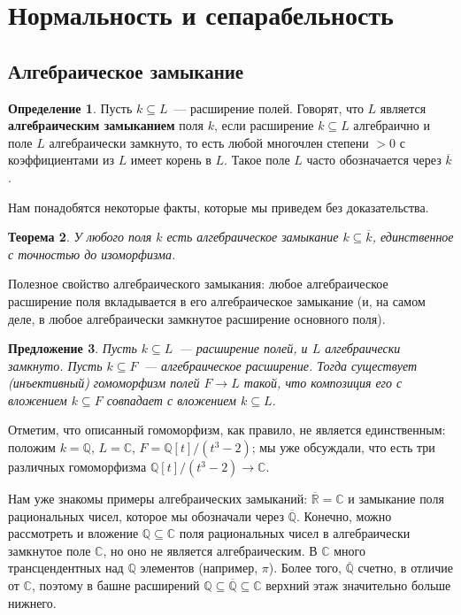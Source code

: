 \documentclass[a4paper,11pt]{scrartcl}
\theoremstyle{plain}
\newtheorem{theorem}{Теорема}[subsection]
\newtheorem{proposition}[theorem]{Предложение}
\theoremstyle{definition}
\newtheorem{definition}[theorem]{Определение}
\newcommand\dfn[1]{\textbf{#1}}
\newcommand\mb{\mathbb}
\newcommand\sseq{\subseteq}
\begin{document}
\section{Нормальность и сепарабельность}

\subsection{Алгебраическое замыкание}

\begin{definition}
Пусть $k\sseq L$~--- расширение полей. Говорят, что $L$ является
\dfn{алгебраическим замыканием} поля $k$, если расширение $k\sseq L$
алгебраично и поле $L$ алгебраически замкнуто, то есть любой
многочлен степени $>0$ с коэффициентами из $L$ имеет корень в $L$.
Такое поле $L$ часто обозначается через $\overline{k}$.
\end{definition}

Нам понадобятся некоторые факты, которые мы приведем без
доказательства.

\begin{theorem}
У любого поля $k$ есть алгебраическое замыкание $k\sseq \overline{k}$,
единственное с точностью до изоморфизма.
\end{theorem}

Полезное свойство алгебраического замыкания: любое алгебраическое
расширение поля вкладывается в его алгебраическое замыкание (и, на
самом деле, в любое алгебраически замкнутое расширение основного поля).

\begin{proposition}\label{proposition_algebraic_closure}
Пусть $k\sseq L$~--- расширение полей, и $L$ алгебраически
замкнуто. Пусть $k\sseq F$~--- алгебраическое расширение. Тогда
существует (инъективный) гомоморфизм полей $F\to L$ такой, что
композиция его с вложением $k\sseq F$ совпадает с вложением $k\sseq L$.
\end{proposition}

Отметим, что описанный гомоморфизм, как правило, не является
единственным: положим $k=\mb Q$, $L=\mb C$, $F=\mb Q[t]/(t^3-2)$; мы
уже обсуждали, что есть три различных гомоморфизма
$\mb Q[t]/(t^3-2)\to \mb C$.

Нам уже знакомы примеры алгебраических замыканий: $\overline{\mb
  R}=\mb C$ и замыкание поля рациональных чисел, которое мы обозначали
через $\overline{\mb Q}$. Конечно, можно рассмотреть и вложение $\mb
Q\sseq\mb C$ поля рациональных чисел в алгебраически замкнутое поле
$\mb C$, но оно не является алгебраическим. В $\mb C$ много
трансцендентных над $\mb Q$ элементов (например, $\pi$). Более того,
$\overline{\mb Q}$ счетно, в отличие от $\mb C$, поэтому в башне
расширений $\mb Q\sseq\overline{\mb Q}\sseq\mb C$ верхний этаж
значительно больше нижнего.
\end{document}
